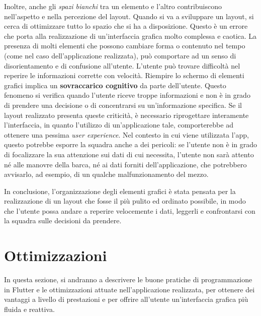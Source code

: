 Inoltre, anche gli \textit{spazi bianchi} tra un elemento e l'altro contribuiscono nell'aspetto e nella percezione del layout. Quando si va a sviluppare un layout, si cerca di ottimizzare tutto lo spazio che si ha a disposizione. Questo è un errore che porta alla realizzazione di un'interfaccia grafica molto complessa e caotica. La presenza di molti elementi che possono cambiare forma o contenuto nel tempo (come nel caso dell'applicazione realizzata), può comportare ad un senso di disorientamento e di confusione all'utente. L'utente può trovare difficoltà nel reperire le informazioni corrette con velocità. Riempire lo schermo di elementi grafici implica un \textbf{sovraccarico cognitivo} da parte dell'utente. Questo fenomeno si verifica quando l'utente riceve troppe informazioni e non è in grado di prendere una decisione o di concentrarsi su un'informazione specifica. Se il layout realizzato presenta queste criticità, è necessario riprogettare interamente l'interfaccia, in quanto l'utilizzo di un'applicazione tale, comporterebbe ad ottenere una pessima \textit{user experience}. Nel contesto in cui viene utilizzata l'app, questo potrebbe esporre la squadra anche a dei pericoli: se l'utente non è in grado di focalizzare la sua attenzione sui dati di cui necessita, l'utente non sarà attento né alle manovre della barca, né ai dati forniti dell'applicazione, che potrebbero avvisarlo, ad esempio, di un qualche malfunzionamento del mezzo.

In conclusione, l'organizzazione degli elementi grafici è stata pensata per la realizzazione di un layout che fosse il più pulito ed ordinato possibile, in modo che l'utente possa andare a reperire velocemente i dati, leggerli e confrontarsi con la squadra sulle decisioni da prendere.

\section{Ottimizzazioni}
In questa sezione, si andranno a descrivere le buone pratiche di programmazione in Flutter e le ottimizzazioni attuate nell'applicazione realizzata, per ottenere dei vantaggi a livello di prestazioni e per offrire all'utente un'interfaccia grafica più fluida e reattiva.

